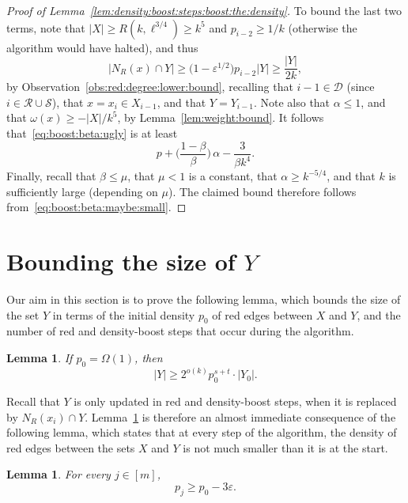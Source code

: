 \documentclass[12pt,reqno]{amsart}
\newtheorem{lemma}[theorem]{Lemma}
\theoremstyle{definition}
\theoremstyle{remark}
\def\cS{\mathcal{S}}
\newcommand\eps{\varepsilon}
\renewcommand{\le}{\leqslant}
\renewcommand{\ge}{\geqslant}
\def\eps{\varepsilon}
\def\cD{\mathcal{D}}
\def\cR{\mathcal{R}}
\begin{document}
\begin{proof}[Proof of Lemma~\ref{lem:density:boost:steps:boost:the:density}]
To bound the last two terms, note that $|X| \ge R(k,\ell^{3/4}) \ge k^5$ and $p_{i-2} \ge 1/k$ (otherwise the algorithm would have halted), and thus 
$$|N_R(x) \cap Y| \ge \big(1 - \eps^{1/2} \big) p_{i-2} |Y| \ge \frac{|Y|}{2k},$$
by Observation~\ref{obs:red:degree:lower:bound}, recalling that $i - 1 \in \cD$ (since $i \in \cR \cup \cS$), that $x = x_i \in X_{i-1}$, and that $Y = Y_{i-1}$. Note also that $\alpha \le 1$, and that $\omega(x) \ge -|X|/k^5$, by Lemma~\ref{lem:weight:bound}. It follows that~\eqref{eq:boost:beta:ugly} is at least
\begin{equation}\label{eq:boost:beta:maybe:small}
p + \bigg( \frac{1-\beta}{\beta} \bigg) \, \alpha - \frac{3}{\beta k^4}.
\end{equation}
Finally, recall that $\beta \le \mu$, that $\mu < 1$ is a constant, that $\alpha \ge k^{-5/4}$, and that $k$ is sufficiently large (depending on $\mu$). %
The claimed bound therefore follows from~\eqref{eq:boost:beta:maybe:small}. 
\end{proof}




\section{Bounding the size of $Y$}\label{Y:sec}

Our aim in this section is to prove the following lemma, which bounds the size of the set $Y$ in terms of the initial density $p_0$ of red edges between $X$ and $Y$, and the number of red and density-boost steps that occur during the algorithm. 

\begin{lemma}\label{lem:Ybound}
If\/ $p_0 = \Omega(1)$, then
$$|Y| \ge 2^{o(k)} p_0^{s + t} \cdot |Y_0|.$$
\end{lemma}

Recall that $Y$ is only updated in red and density-boost steps, when it is replaced by $N_R(x_i) \cap Y$. Lemma~\ref{lem:Ybound} is therefore an almost immediate consequence of the following lemma, which states that at every step of the algorithm, the density of red edges between the sets $X$ and $Y$ is not much smaller than it is at the start. 

\begin{lemma}\label{lem:bounding:p}
For every $j \in [m]$, 
\begin{equation}\label{eq:p:lower:bound}
p_j \ge p_0 - 3\eps.
\end{equation}
\end{lemma}
\end{document}
